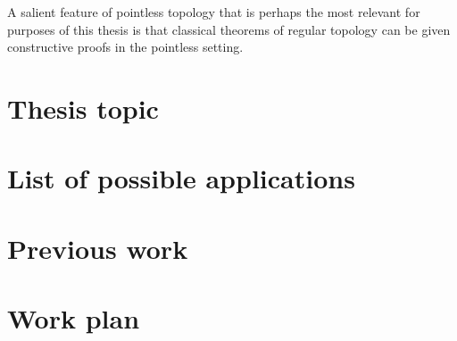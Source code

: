 \documentclass[11pt]{article}
\begin{document}
A salient feature of pointless topology that is perhaps the most relevant for purposes of
this thesis is that classical theorems of regular topology can be given constructive
proofs in the pointless setting.

\section{Thesis topic}

\section{List of possible applications}

\section{Previous work}

\section{Work plan}



\end{document}
